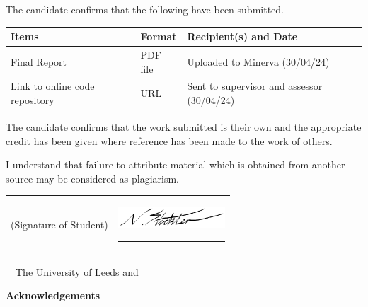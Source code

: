 \frontcover

\clearpage

\noindent The candidate confirms that the following have been submitted.\\


\begin{table}[ht!]
\begin{tabular}{|p{}|p{}|p{}|}
\hline 
Items & Format & Recipient(s) and Date \\ 
\hline 
Final Report & PDF file & Uploaded to Minerva (30/04/24) \\ 
\hline 
Link to online code repository & URL & Sent to supervisor and assessor (30/04/24) \\ 
\hline 
\end{tabular} 
\end{table}


\vfill

\noindent The candidate confirms that the work submitted is their own and the appropriate credit has been given where reference has been made to the work of others.

\vfill

\noindent I understand that failure to attribute material which is obtained from another source may be considered as plagiarism.

\vfill

\flushright
\begin{tabular}{l l}
    (Signature of Student) & \parbox{50mm}{\centering \includegraphics[width=40mm]{./assets/signature.png} \hrule} \\
\end{tabular}
\flushleft

\vfill

\textcopyright~\session~The University of Leeds and~\fullname

\begin{dissertationsummary}

\end{dissertationsummary}

\clearpage
\centering\textbf{Acknowledgements}
\flushleft


\tableofcontents

\clearpage

